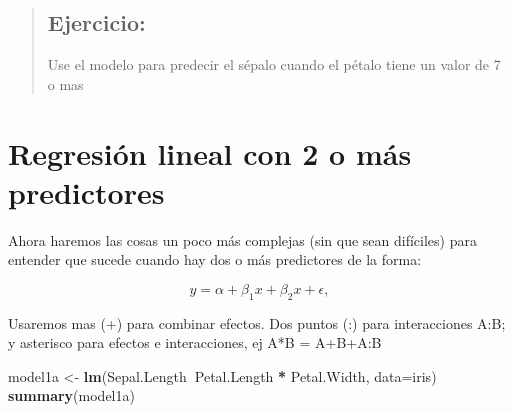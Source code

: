 \documentclass[
]{book}
\newenvironment{Shaded}{\begin{snugshade}}{\end{snugshade}}
\newcommand{\DataTypeTok}[1]{\textcolor[rgb]{0.13,0.29,0.53}{#1}}
\newcommand{\KeywordTok}[1]{\textcolor[rgb]{0.13,0.29,0.53}{\textbf{#1}}}
\newcommand{\NormalTok}[1]{#1}
\newcommand{\OperatorTok}[1]{\textcolor[rgb]{0.81,0.36,0.00}{\textbf{#1}}}
\newcommand{\StringTok}[1]{\textcolor[rgb]{0.31,0.60,0.02}{#1}}
\begin{document}
\begin{quote}
\hypertarget{ejercicio-4}{%
\subsection{Ejercicio:}\label{ejercicio-4}}

Use el modelo para predecir el sépalo cuando el pétalo tiene un valor de 7 o mas
\end{quote}

\hypertarget{regresiuxf3n-lineal-con-2-o-muxe1s-predictores}{%
\section{Regresión lineal con 2 o más predictores}\label{regresiuxf3n-lineal-con-2-o-muxe1s-predictores}}

Ahora haremos las cosas un poco más complejas (sin que sean difíciles) para entender que sucede cuando hay dos o más predictores de la forma:

\begin{equation} 
y = \alpha +\beta_{1}\mathit{x} +\beta_{2}\mathit{x} +\epsilon,
  \label{eq:binom}
\end{equation}

Usaremos mas (+) para combinar efectos. Dos puntos (:) para interacciones A:B; y asterisco para efectos e interacciones, ej A*B = A+B+A:B

\begin{Shaded}
\begin{Highlighting}[]
\NormalTok{model1a <-}\StringTok{ }\KeywordTok{lm}\NormalTok{(Sepal.Length}\OperatorTok{~}\NormalTok{Petal.Length }\OperatorTok{*}\StringTok{ }\NormalTok{Petal.Width, }\DataTypeTok{data=}\NormalTok{iris)}
\KeywordTok{summary}\NormalTok{(model1a)}
\end{Highlighting}
\end{Shaded}
\end{document}
